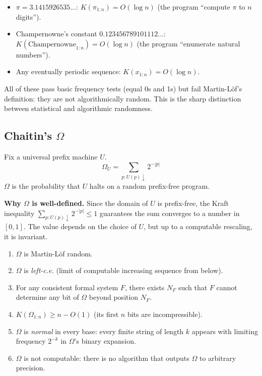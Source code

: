 \begin{example}
\begin{itemize}
\item $\pi = 3.1415926535\ldots$: $K(\pi_{1:n}) = O(\log n)$ (the program ``compute $\pi$ to $n$ digits'').
\item Champernowne's constant $0.123456789101112\ldots$: $K(\text{Champernowne}_{1:n}) = O(\log n)$ (the program ``enumerate natural numbers'').
\item Any eventually periodic sequence: $K(x_{1:n}) = O(\log n)$.
\end{itemize}
All of these pass basic frequency tests (equal 0s and 1s) but fail Martin-L\"of's definition: they are not algorithmically random. This is the sharp distinction between statistical and algorithmic randomness.
\end{example}

\subsection{Chaitin's \texorpdfstring{$\Omega$}{Ω}}
\label{sec:kolmogorov:omega}

\begin{definition}
Fix a universal prefix machine $U$. 
\[
\Omega_U = \sum_{p: U(p) \downarrow} 2^{-|p|}
\]
$\Omega$ is the probability that $U$ halts on a random prefix-free program.
\end{definition}

\textbf{Why $\Omega$ is well-defined.} Since the domain of $U$ is prefix-free, the Kraft inequality $\sum_{p: U(p)\downarrow} 2^{-|p|} \le 1$ guarantees the sum converges to a number in $[0,1]$. The value depends on the choice of $U$, but up to a computable rescaling, it is invariant.

\begin{theorem}
\label{thm:omega_properties}
\begin{enumerate}
\item $\Omega$ is Martin-L\"of random.
\item $\Omega$ is \emph{left-c.e.} (limit of computable increasing sequence from below).
\item For any consistent formal system $F$, there exists $N_F$ such that $F$ cannot determine any bit of $\Omega$ beyond position $N_F$.
\item $K(\Omega_{1:n}) \ge n - O(1)$ (its first $n$ bits are incompressible).
\item $\Omega$ is \emph{normal} in every base: every finite string of length $k$ appears with limiting frequency $2^{-k}$ in $\Omega$'s binary expansion.
\item $\Omega$ is not computable: there is no algorithm that outputs $\Omega$ to arbitrary precision.
\end{enumerate}
\end{theorem}

